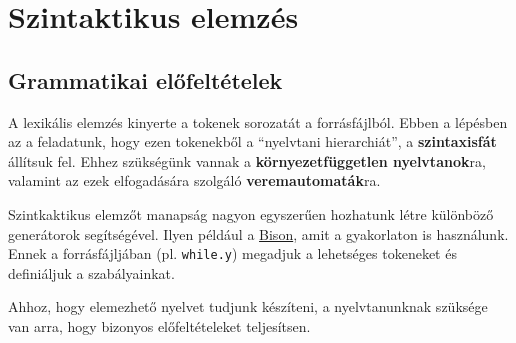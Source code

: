 \chapter{Szintaktikus elemzés}

\section{Grammatikai előfeltételek}

A lexikális elemzés kinyerte a tokenek sorozatát a forrásfájlból. Ebben a lépésben az a feladatunk, hogy ezen tokenekből a ``nyelvtani hierarchiát'', a \textbf{szintaxisfát} állítsuk fel. Ehhez szükségünk vannak a \textbf{környezetfüggetlen nyelvtanok}ra, valamint az ezek elfogadására szolgáló \textbf{veremautomaták}ra.

Szintkaktikus elemzőt manapság nagyon egyszerűen hozhatunk létre különböző generátorok segítségével. Ilyen például a \href{https://www.gnu.org/software/bison/}{Bison}, amit a gyakorlaton is használunk. Ennek a forrásfájljában (pl. \texttt{while.y}) megadjuk a lehetséges tokeneket és definiáljuk a szabályainkat.

Ahhoz, hogy elemezhető nyelvet tudjunk készíteni, a nyelvtanunknak szüksége van arra, hogy bizonyos előfeltételeket teljesítsen.

